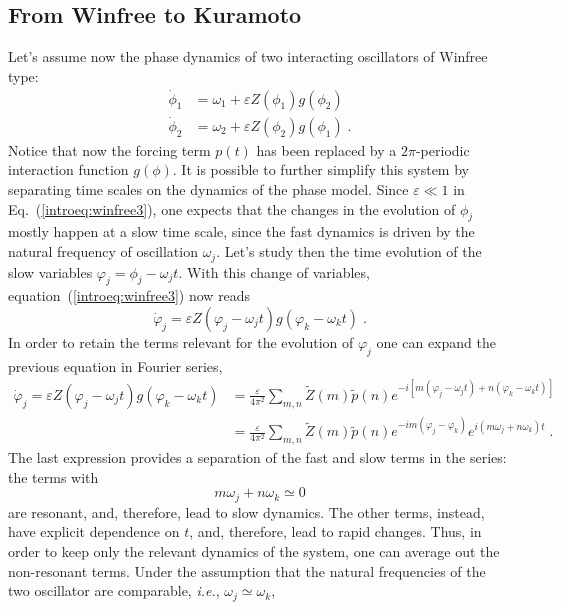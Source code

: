 \subsection{From Winfree to Kuramoto}

Let's assume now the phase dynamics of two interacting oscillators of Winfree type:
\begin{align}\label{introeq:winfree3}
\dot \phi_1 &= \omega_1 + \varepsilon Z(\phi_1)g(\phi_2)\\
\dot \phi_2 &= \omega_2 + \varepsilon Z(\phi_2)g(\phi_1)\;.
\end{align}
Notice that now the forcing term $p(t)$ has been replaced by a $2\pi$-periodic interaction function $g(\phi)$.
It is possible to further simplify this system by separating time scales on the dynamics of the phase model.
Since $\varepsilon\ll 1$ in Eq.~(\ref{introeq:winfree3}), one expects that the changes
in the evolution of $\phi_j$ mostly happen at a slow time scale, since the fast dynamics is
driven by the natural frequency of oscillation $\omega_j$.
Let's study then the time evolution of the slow variables $\varphi_j=\phi_j-\omega_j t$.
With this change of variables, equation~(\ref{introeq:winfree3}) now reads
\begin{equation}
\dot \varphi_j=   \varepsilon Z(\varphi_j-\omega_j t)g(\varphi_k-\omega_k t)\;.
\end{equation}
In order to retain the terms relevant for the evolution of $\varphi_j$ one can expand
the previous equation in Fourier series,
\begin{align}\label{introeq:tokuramoto}
\dot \varphi_j=   \varepsilon  Z(\varphi_j-\omega_j t)g(\varphi_k-\omega_k t)
        &=\frac{\varepsilon}{4\pi^2}\sum_{m,n}\tilde Z(m)\tilde p(n)e^{-i[m(\varphi_j-\omega_j t) +n(\varphi_k-\omega_k t)]}\\
        &=\frac{\varepsilon}{4\pi^2}\sum_{m,n}\tilde Z(m)\tilde p(n)e^{-im(\varphi_j-\varphi_k)}e^{i(m\omega_j + n\omega_k)t}\;.
\end{align}
The last expression provides a separation of the fast and slow terms in the series:
the terms with
\begin{equation}
 m\omega_j +n \omega_k \simeq 0
\end{equation}
are resonant, and, therefore, lead to slow dynamics.
The other terms, instead, have explicit dependence on $t$, and, therefore, lead to rapid changes.
Thus, in order to keep only the relevant dynamics of the system, one can average out
the non-resonant terms.
Under the assumption that the natural frequencies of the two oscillator are comparable, \emph{i.e.}, $\omega_j\simeq \omega_k$,
